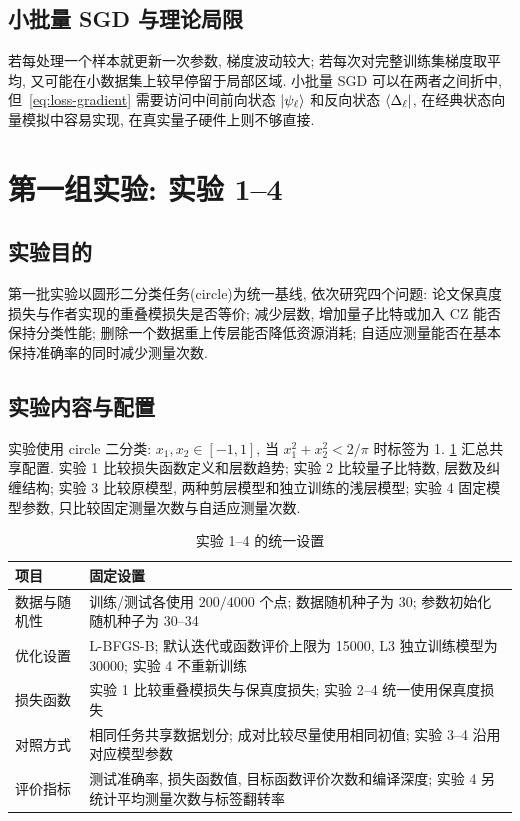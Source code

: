\documentclass[a4paper]{ctexart}
\begin{document}
\subsection{小批量 SGD 与理论局限}

若每处理一个样本就更新一次参数, 梯度波动较大; 若每次对完整训练集梯度取平均, 又可能在小数据集上较早停留于局部区域. 小批量 SGD 可以在两者之间折中, 但~\eqref{eq:loss-gradient} 需要访问中间前向状态 $\ket{\psi_\ell}$ 和反向状态 $\bra{\Delta_\ell}$, 在经典状态向量模拟中容易实现, 在真实量子硬件上则不够直接.

\section{第一组实验: 实验 1--4}

\subsection{实验目的}

第一批实验以圆形二分类任务(circle)为统一基线, 依次研究四个问题: 论文保真度损失与作者实现的重叠模损失是否等价; 减少层数, 增加量子比特或加入 CZ 能否保持分类性能; 删除一个数据重上传层能否降低资源消耗; 自适应测量能否在基本保持准确率的同时减少测量次数.

\subsection{实验内容与配置}

实验使用 circle 二分类: $x_1,x_2\in[-1,1]$, 当 $x_1^2+x_2^2<2/\pi$ 时标签为 1. \cref{tab:m1-m2-protocol} 汇总共享配置. 实验 1 比较损失函数定义和层数趋势; 实验 2 比较量子比特数, 层数及纠缠结构; 实验 3 比较原模型, 两种剪层模型和独立训练的浅层模型; 实验 4 固定模型参数, 只比较固定测量次数与自适应测量次数.

\begin{table}[H]
    \centering
    \caption{实验 1--4 的统一设置}
    \label{tab:m1-m2-protocol}
    \renewcommand{\arraystretch}{1.3}
    \begin{tabular}{@{}p{}p{}@{}}
        \toprule
        项目     & 固定设置                                                       \\
        \midrule
        数据与随机性 & 训练/测试各使用 $200/4000$ 个点; 数据随机种子为 30; 参数初始化随机种子为 30--34      \\
        优化设置   & L-BFGS-B; 默认迭代或函数评价上限为 15000, L3 独立训练模型为 30000; 实验 4 不重新训练 \\
        损失函数   & 实验 1 比较重叠模损失与保真度损失; 实验 2--4 统一使用保真度损失                      \\
        对照方式   & 相同任务共享数据划分; 成对比较尽量使用相同初值; 实验 3--4 沿用对应模型参数                 \\
        评价指标   & 测试准确率, 损失函数值, 目标函数评价次数和编译深度; 实验 4 另统计平均测量次数与标签翻转率          \\
        \bottomrule
    \end{tabular}
\end{table}
\end{document}
